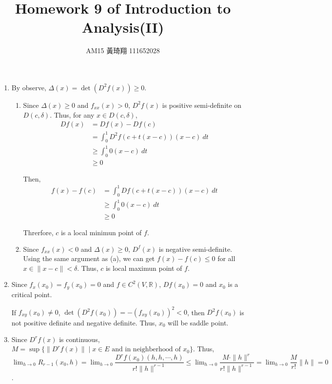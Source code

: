 \documentclass[12pt]{article}
\title{Homework 9 of Introduction to Analysis(II)}
\author{AM15 黃琦翔 111652028}
\begin{document}
\maketitle
\begin{enumerate}
    \item By observe, $\Delta(x) = \det(D^2f(x))\geq 0$.
    \begin{enumerate}
        \item Since $\Delta(x) \geq 0$ and $f_{xx}(x) > 0$, $D^2f(x)$ is positive semi-definite on $D(c, \delta)$.
        Thus, for any $x \in D(c, \delta)$, \begin{align*}
            Df(x) &= Df(x) - Df(c)\\
            &= \int_{0}^{1} D^2f(c+t(x-c))(x-c)\ dt\\
            &\geq \int_{0}^{1} 0(x-c)\ dt\\
            &\geq 0
        \end{align*}
        
        Then, \begin{align*}
            f(x) - f(c) &= \int_{0}^1 Df(c + t(x-c))(x-c)\ dt\\
            &\geq \int_{0}^{1} 0(x-c)\ dt\\
            &\geq 0
        \end{align*}

        Threrfore, $c$ is a local minimun point of $f$. 

        \item Since $f_{xx}(x) < 0$ and $\Delta(x) \geq 0$, $D^f(x)$ is negative semi-definite.
        Using the same argument as (a), we can get $f(x) - f(c) \leq 0$ for all $x\in \| x-c\| < \delta$.
        Thus, $c$ is local maximun point of $f$.

    \end{enumerate}

    \newpage
    \item Since $f_x(x_0) = f_y(x_0) = 0$ and $f \in C^2(V, \mathbb{R})$, $Df(x_0) = 0$ and $x_0$ is a critical point.
    
    If $f_{xy}(x_0)\neq 0$, $\det(D^2f(x_0)) = - (f_{xy}(x_0))^2 < 0$, then $D^2f(x_0)$ is not positive definite and negative definite.
    Thus, $x_0$ will be saddle point.

    \item Since $D^rf(x)$ is continuous, $M = \sup\{ \| D^rf(x) \| \mid x \in E \text{ and in neighberhood of } x_0\}$.
    Thus, $\displaystyle\lim_{h\to 0} R_{r-1}(x_0, h) = \displaystyle\lim_{h\to 0} \dfrac{D^rf(x_0)(h, h, \cdots, h)}{r!\| h\|^{r-1}} \leq \displaystyle\lim_{h\to 0} \dfrac{M \cdot \| h\|^r}{r!\|h\|^{r-1}} = \displaystyle\lim_{h\to 0} \dfrac{M}{r!}\|h\| =0$.

\end{enumerate}
\end{document}
